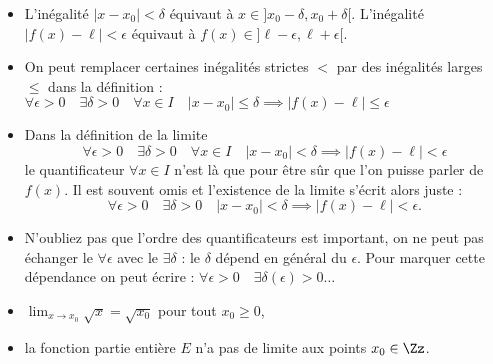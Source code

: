 \documentclass[class=report,crop=false]{standalone}
\begin{document}

\begin{remarque*}
\sauteligne
\begin{itemize}
  \item L'inégalité $\vert x-x_0\vert <\delta$ équivaut à $x \in ]x_0 - \delta, x_0+\delta[$.
  L'inégalité $\vert f(x)-\ell\vert <\epsilon$ équivaut à $f(x) \in ]\ell - \epsilon, \ell+\epsilon[$.

  \item On peut remplacer certaines inégalités strictes \og $<$ \fg{} par des inégalités larges 
  \og $\le $ \fg{} dans la définition :
  $\forall \epsilon>0 \quad \exists \delta>0 \quad \forall x\in I \quad \vert x-x_0\vert \le \delta
\implies \vert f(x)-\ell\vert \le \epsilon$

  \item Dans la définition de la limite
$$\forall \epsilon>0 \quad \exists \delta>0 \quad \forall x\in I \quad \vert x-x_0\vert <\delta
\implies \vert f(x)-\ell\vert <\epsilon$$
le quantificateur $\forall x\in I$ n'est là que pour être sûr que l'on puisse parler de $f(x)$.
Il est souvent omis et l'existence de la limite s'écrit alors juste :
\[\forall \epsilon>0 \quad \exists \delta>0  \quad \vert x-x_0\vert <\delta
\implies \vert f(x)-\ell\vert <\epsilon .\]

  \item N'oubliez pas que l'ordre des quantificateurs est important, on ne peut pas échanger le $\forall \epsilon$ avec le $\exists \delta$ :
le $\delta$ dépend en général du $\epsilon$. Pour marquer cette dépendance on peut écrire :
$\forall \epsilon>0 \quad \exists \delta(\epsilon) >0 \ldots$
\end{itemize}



\medskip


\end{remarque*}

\begin{exemple}
\sauteligne
\begin{itemize}
\item $\displaystyle\lim_{x\to x_0} \sqrt{x} = \sqrt{x_0}$ pour tout $x_0\geq0$,
\item la fonction partie entière $E$ n'a pas de limite aux points $x_0\in\Zz$.
\end{itemize}
\end{exemple}

\end{document}
